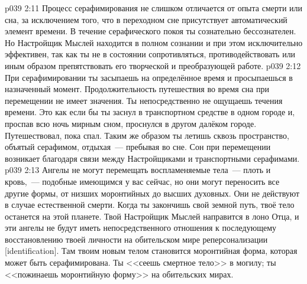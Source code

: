 \vs p039 2:11 Процесс серафимирования не слишком отличается от опыта смерти или сна, за исключением того, что в переходном сне присутствует автоматический элемент времени. В течение серафического покоя ты сознательно бессознателен. Но Настройщик Мыслей находится в полном сознании и при этом исключительно эффективен, так как ты не в состоянии сопротивляться, противодействовать или иным образом препятствовать его творческой и преобразующей работе.
\vs p039 2:12 При серафимировании ты засыпаешь на определённое время и просыпаешься в назначенный момент. Продолжительность путешествия во время сна при перемещении не имеет значения. Ты непосредственно не ощущаешь течения времени. Это как если бы ты заснул в транспортном средстве в одном городе и, проспав всю ночь мирным сном, проснулся в другом далёком городе. Путешествовал, пока спал. Таким же образом ты летишь сквозь пространство, объятый серафимом, отдыхая~--- пребывая во сне. Сон при перемещении возникает благодаря связи между Настройщиками и транспортными серафимами.
\vs p039 2:13 \pc Ангелы не могут перемещать воспламеняемые тела~--- плоть и кровь,~--- подобные имеющимся у вас сейчас, но они могут переносить все другие формы, от низших моронтийных до высших духовных. Они не действуют в случае естественной смерти. Когда ты закончишь свой земной путь, твоё тело останется на этой планете. Твой Настройщик Мыслей направится в лоно Отца, и эти ангелы не будут иметь непосредственного отношения к последующему восстановлению твоей личности на обительском мире реперсонализации [identification]. Там твоим новым телом становится моронтийная форма, которая может быть серафимирована. Ты <<сеешь смертное тело>> в могилу; ты <<пожинаешь моронтийную форму>> на обительских мирах.
